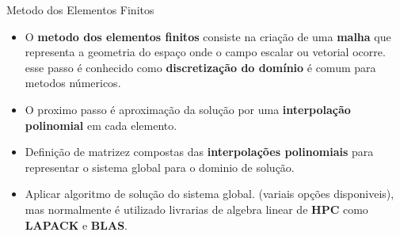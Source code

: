\documentclass{beamer}
\begin{document}
		\begin{frame}{Metodo dos Elementos Finitos}
			\begin{itemize}
				\item O \textbf{metodo dos elementos finitos} consiste na criação de uma \textbf{malha} que representa a geometria do espaço onde o campo escalar ou vetorial ocorre. esse passo é conhecido como \textbf{discretização do domínio} é comum para metodos númericos.
				\item O proximo passo é aproximação da solução por uma \textbf{interpolação polinomial} em cada elemento.
				\item Definição de matrizez compostas das \textbf{interpolações polinomiais} para representar o sistema global para o dominio de solução.
				\item Aplicar algoritmo de solução do sistema global. (variais opções disponiveis), mas normalmente é utilizado livrarias de algebra linear de \textbf{HPC} como \textbf{LAPACK} e \textbf{BLAS}.
			\end{itemize}
		\end{frame}
\end{document}
